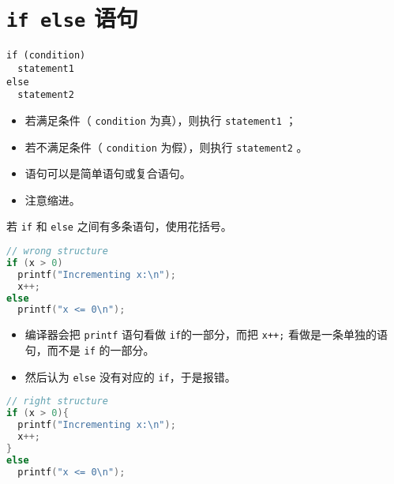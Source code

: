 \section{\lstinline|if else| 语句}

\begin{frame}[fragile]\ft{\secname}
\begin{lstlisting}[]
if (condition)
  statement1
else
  statement2
\end{lstlisting} \pause 
\begin{itemize}
\item  若满足条件（ \lstinline|condition| 为真），则执行 \lstinline|statement1| ；
\item[]若不满足条件（ \lstinline|condition| 为假），则执行 \lstinline|statement2| 。\\[0.1in]
\item 语句可以是简单语句或复合语句。\\[0.1in]
\item 注意缩进。
\end{itemize}
\end{frame}

\begin{frame}[fragile]\ft{\secname}
若 \lstinline|if| 和 \lstinline|else| 之间有多条语句，使用花括号。
\begin{lstlisting}[language=c]
// wrong structure
if (x > 0)
  printf("Incrementing x:\n");
  x++;
else
  printf("x <= 0\n");
\end{lstlisting}\pause
\begin{itemize}
\item  编译器会把 \lstinline|printf| 语句看做 \lstinline|if|的一部分，而把 \lstinline|x++;| 看做是一条单独的语句，而不是 \lstinline|if| 的一部分。\\[0.1in]
\item 然后认为 \lstinline|else| 没有对应的 \lstinline|if|，于是报错。
\end{itemize}
\end{frame}

\begin{frame}[fragile]\ft{\secname}
\begin{lstlisting}[language=c]
// right structure
if (x > 0){
  printf("Incrementing x:\n");
  x++;
}       
else
  printf("x <= 0\n");
\end{lstlisting}
\end{frame}




